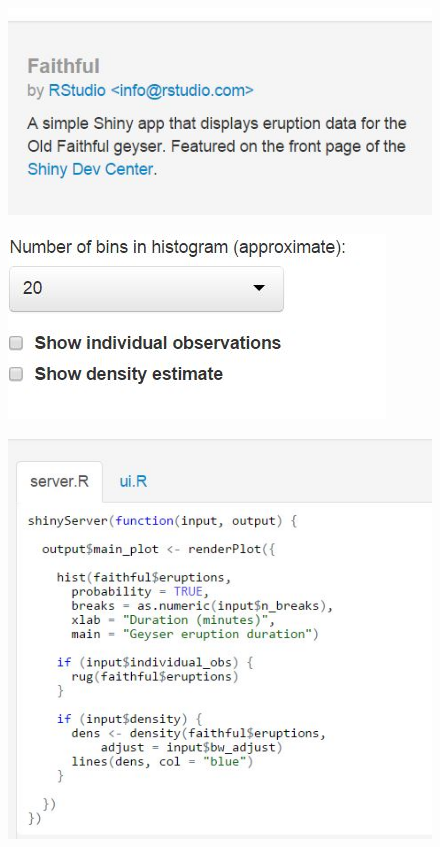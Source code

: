 \documentclass{beamer}
\begin{document}
\begin{frame}
	\begin{figure}
\centering
\includegraphics[width=0.\linewidth]{01-faithful}
\caption{}
\label{fig:01-faithful}
\end{figure}

\end{frame}
\begin{frame}
\begin{figure}
	\centering
	\includegraphics[width=0.9\linewidth]{01-sidebar}
\end{figure}
\end{frame}
\begin{frame}
	\begin{figure}
		\centering
		\includegraphics[width=0.9\linewidth]{01-server}
	\end{figure}
\end{frame}
\end{document}
